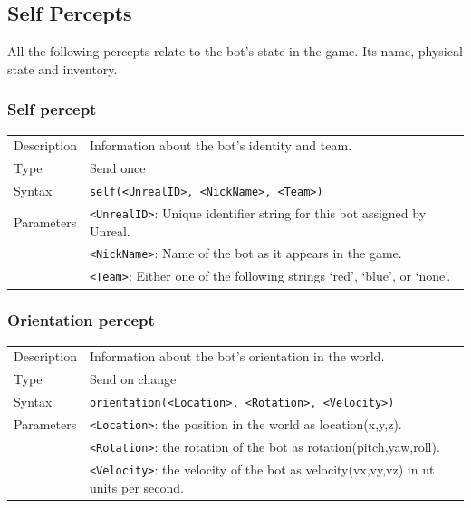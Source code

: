 \documentclass[11pt,a4paper]{article}
\begin{document}
%
\subsection{Self Percepts}
%
All the following percepts relate to the bot's state in the game. Its name, physical state and inventory.

\subsubsection*{Self percept}
\begin{small}
\begin{tabular}{p{2cm}p{9cm}}
Description & Information about the bot's identity and team.\\
Type & Send once\\
Syntax & \verb|self(<UnrealID>, <NickName>, <Team>)|\\ 
Parameters &
\verb|<UnrealID>|: Unique identifier string for this bot assigned by Unreal.\\
& \verb|<NickName>|: Name of the bot as it appears in the game.\\
& \verb|<Team>|: Either one of the following strings ‘red’, ‘blue’, or ‘none’.
\end{tabular}
\end{small}

\subsubsection*{Orientation percept}
\begin{small}
\begin{tabular}{p{2cm}p{9cm}}
Description & Information about the bot's orientation in the world.\\
Type & Send on change\\
Syntax & \verb|orientation(<Location>, <Rotation>, <Velocity>)|\\ 
Parameters &
\verb|<Location>|: the position in the world as location(x,y,z).\\
& \verb|<Rotation>|: the rotation of the bot as rotation(pitch,yaw,roll).\\
& \verb|<Velocity>|: the velocity of the bot as velocity(vx,vy,vz) in ut units per second.
\end{tabular}
\end{small}
\end{document}
